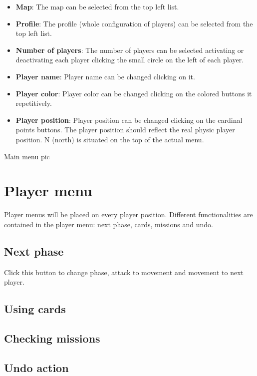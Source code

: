 \documentclass[12pt,a4paper]{article}
\begin{document}
\begin{itemize}
\item {\bf Map}: The map can be selected from the top left list.
\item {\bf Profile}: The profile (whole configuration of players) can be selected from the top left list.
\item {\bf Number of players}: The number of players can be selected activating or deactivating each player clicking the small circle on the left of each player.
\item {\bf Player name}: Player name can be changed clicking on it.
\item {\bf Player color}: Player color can be changed clicking on the colored buttons it repetitively.
\item {\bf Player position}: Player position can be changed clicking on the cardinal points buttons. The player position should reflect the real physic player position. N (north) is situated on the top of the actual menu.
\end{itemize}

\begin{todo}[Alberto]
  Main menu pic
\end{todo}

\section{Player menu}
Player menus will be placed on every player position. Different functionalities are contained in the player menu: next phase, cards, missions and undo.

\subsection{Next phase}
Click this button to change phase, attack to movement and movement to next player.

\subsection{Using cards}

\subsection{Checking missions}
\subsection{Undo action}
\end{document}
